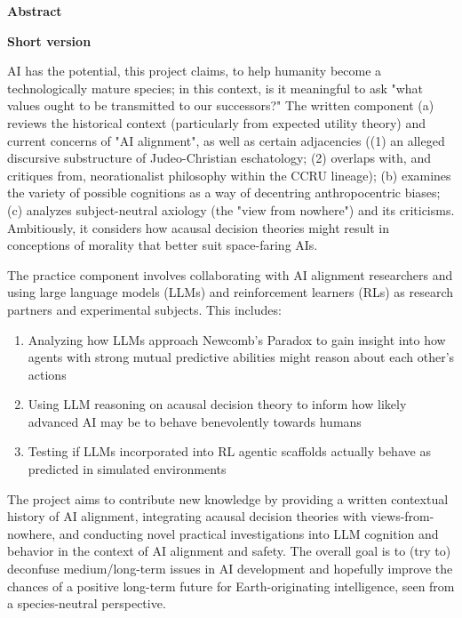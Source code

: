 \newpage
\begin{abstractspacing}

\begin{center}
    \textbf{Abstract}
\end{center}

\noindent\textbf{Short version}

AI has the potential, this project claims, to help humanity become a technologically mature species; in this context, is it meaningful to ask "what values ought to be transmitted to our successors?" The written component (a) reviews the historical context (particularly from expected utility theory) and current concerns of "AI alignment", as well as certain adjacencies ((1) an alleged discursive substructure of Judeo-Christian eschatology; (2) overlaps with, and critiques from, neorationalist philosophy within the CCRU lineage); (b) examines the variety of possible cognitions as a way of decentring anthropocentric biases; (c) analyzes subject-neutral axiology (the "view from nowhere") and its criticisms. Ambitiously, it considers how acausal decision theories might result in conceptions of morality that better suit space-faring AIs.

The practice component involves collaborating with AI alignment researchers and using large language models (LLMs) and reinforcement learners (RLs) as research partners and experimental subjects. This includes:

\begin{enumerate}
\item Analyzing how LLMs approach Newcomb's Paradox to gain insight into how agents with strong mutual predictive abilities might reason about each other's actions 
\item Using LLM reasoning on acausal decision theory to inform how likely advanced AI may be to behave benevolently towards humans
\item Testing if LLMs incorporated into RL agentic scaffolds actually behave as predicted in simulated environments 
\end{enumerate}

The project aims to contribute new knowledge by providing a written contextual history of AI alignment, integrating acausal decision theories with views-from-nowhere, and conducting novel practical investigations into LLM cognition and behavior in the context of AI alignment and safety. The overall goal is to (try to) deconfuse medium/long-term issues in AI development and hopefully improve the chances of a positive long-term future for Earth-originating intelligence, seen from a species-neutral perspective.


\end{abstractspacing}
